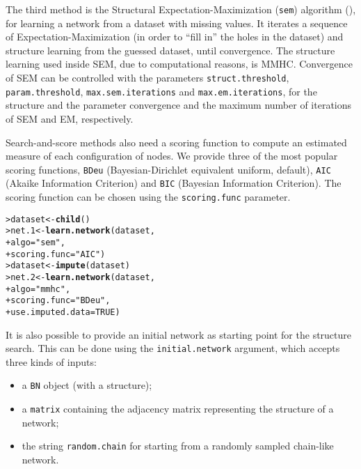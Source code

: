 \documentclass{article}\usepackage[]{graphicx}\usepackage[]{color}
\makeatletter
\newcommand{\hlnum}[1]{\textcolor[rgb]{0.686,0.059,0.569}{#1}}%
\newcommand{\hlstr}[1]{\textcolor[rgb]{0.192,0.494,0.8}{#1}}%
\newcommand{\hlstd}[1]{\textcolor[rgb]{0.345,0.345,0.345}{#1}}%
\newcommand{\hlkwb}[1]{\textcolor[rgb]{0.69,0.353,0.396}{#1}}%
\newcommand{\hlkwc}[1]{\textcolor[rgb]{0.333,0.667,0.333}{#1}}%
\newcommand{\hlkwd}[1]{\textcolor[rgb]{0.737,0.353,0.396}{\textbf{#1}}}%
\newenvironment{kframe}{%
 \def\at@end@of@kframe{}%
 \ifinner\ifhmode%
  \def\at@end@of@kframe{\end{minipage}}%
  \begin{minipage}{\columnwidth}%
 \fi\fi%
 \def\FrameCommand##1{\hskip\@totalleftmargin \hskip-\fboxsep
 \colorbox{shadecolor}{##1}\hskip-\fboxsep
     \hskip-\linewidth \hskip-\@totalleftmargin \hskip\columnwidth}%
 \MakeFramed {\advance\hsize-\width
   \@totalleftmargin\z@ \linewidth\hsize
   \@setminipage}}%
 {\par\unskip\endMakeFramed%
 \at@end@of@kframe}
\newenvironment{knitrout}{}{} %
\newcommand{\Robject}[1]{{\texttt{#1}}}
\newcommand{\Rfunarg}[1]{{\texttt{#1}}}
\makeatother
\begin{document}
The third method is the Structural Expectation-Maximization (\texttt{sem}) algorithm (\citet{friedman1997learning,friedman1998bayesian}),
for learning a network from a dataset with missing values. It iterates a sequence of Expectation-Maximization (in order to ``fill in''
the holes in the dataset) and structure learning from the guessed dataset, until convergence. The structure learning used inside SEM,
due to computational reasons, is MMHC. Convergence of SEM can be controlled with the parameters \Rfunarg{struct.threshold},
\Rfunarg{param.threshold}, \Rfunarg{max.sem.iterations} and \Rfunarg{max.em.iterations},
for the structure and the parameter convergence and the maximum number of iterations of SEM and EM, respectively.

Search-and-score methods also need a scoring function to compute an estimated measure of each configuration of nodes.
We provide three of the most popular scoring functions, \texttt{BDeu} (Bayesian-Dirichlet equivalent uniform, default),
\texttt{AIC} (Akaike Information Criterion) and \texttt{BIC} (Bayesian Information Criterion). The scoring function
can be chosen using the \texttt{scoring.func} parameter.

\begin{knitrout}
\color{fgcolor}\begin{kframe}
\begin{alltt}
\hlstd{> }\hlstd{dataset} \hlkwb{<-} \hlkwd{child}\hlstd{()}
\hlstd{> }\hlstd{net.1}   \hlkwb{<-} \hlkwd{learn.network}\hlstd{(dataset,}
\hlstd{+ }                         \hlkwc{algo} \hlstd{=} \hlstr{"sem"}\hlstd{,}
\hlstd{+ }                         \hlkwc{scoring.func} \hlstd{=} \hlstr{"AIC"}\hlstd{)}
\hlstd{> }\hlstd{dataset} \hlkwb{<-} \hlkwd{impute}\hlstd{(dataset)}
\hlstd{> }\hlstd{net.2}   \hlkwb{<-} \hlkwd{learn.network}\hlstd{(dataset,}
\hlstd{+ }                         \hlkwc{algo} \hlstd{=} \hlstr{"mmhc"}\hlstd{,}
\hlstd{+ }                         \hlkwc{scoring.func} \hlstd{=} \hlstr{"BDeu"}\hlstd{,}
\hlstd{+ }                         \hlkwc{use.imputed.data} \hlstd{=} \hlnum{TRUE}\hlstd{)}
\end{alltt}
\end{kframe}
\end{knitrout}

It is also possible to provide an initial network as starting point for the structure search. This can be
done using the \texttt{initial.network} argument, which accepts three kinds of inputs:
\begin{itemize}
\item a \Robject{BN} object (with a structure);
\item a \Robject{matrix} containing the adjacency matrix representing the structure of a network;
\item the string \texttt{random.chain} for starting from a randomly sampled chain-like network.
\end{itemize}
\end{document}
